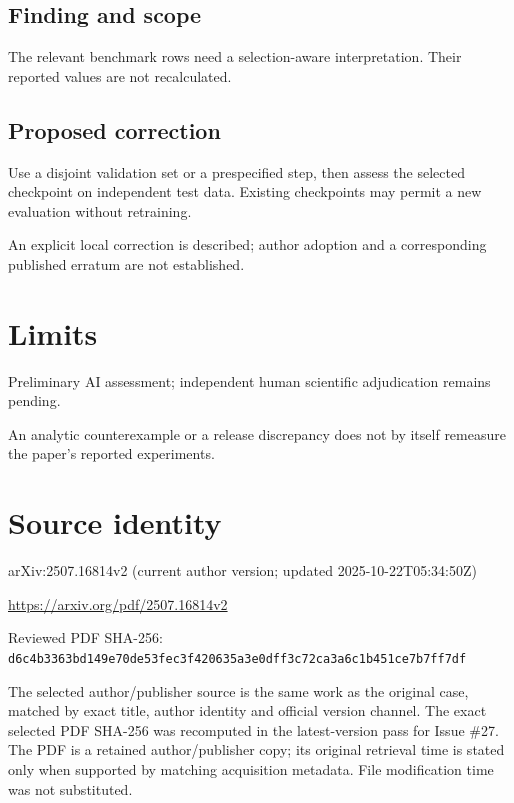 \documentclass[11pt]{article}
\begin{document}
\subsection*{Finding and scope}

The relevant benchmark rows need a selection-aware interpretation. Their reported values are not recalculated.

\subsection*{Proposed correction}

Use a disjoint validation set or a prespecified step, then assess the selected checkpoint on independent test data. Existing checkpoints may permit a new evaluation without retraining.

An explicit local correction is described; author adoption and a corresponding published erratum are not established.

\section*{Limits}

Preliminary AI assessment; independent human scientific adjudication remains pending.\par

An analytic counterexample or a release discrepancy does not by itself remeasure the paper’s reported experiments.\par

\section*{Source identity}

arXiv:2507.16814v2 (current author version; updated 2025-10-22T05:34:50Z)

\url{https://arxiv.org/pdf/2507.16814v2}

Reviewed PDF SHA-256: \nolinkurl{d6c4b3363bd149e70de53fec3f420635a3e0dff3c72ca3a6c1b451ce7b7ff7df}

The selected author/publisher source is the same work as the original case, matched by exact title, author identity and official version channel. The exact selected PDF SHA-256 was recomputed in the latest-version pass for Issue \#27. The PDF is a retained author/publisher copy; its original retrieval time is stated only when supported by matching acquisition metadata. File modification time was not substituted.
\end{document}
